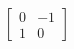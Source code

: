 \documentclass[preview]{standalone}
\begin{document}
\begin{align*}
\begin{bmatrix} 0 & -1 \\ 1 & 0 \end{bmatrix}
\end{align*}
\end{document}
